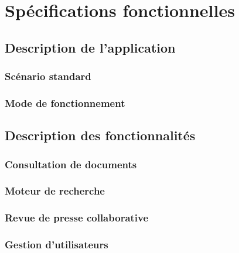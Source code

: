 \section{Spécifications fonctionnelles}
\label{sec:spec}

	\subsection{Description de l'application}
	\label{sec:dapp}

		\subsubsection{Scénario standard}
		\label{sec:scen}

		\subsubsection{Mode de fonctionnement}
		\label{sec:fonc}

	\subsection{Description des fonctionnalités}
	\label{sec:fonc}

		\subsubsection{Consultation de documents}
		\label{sec:cons}

		\subsubsection{Moteur de recherche}
		\label{sec:rech}

		\subsubsection{Revue de presse collaborative}
		\label{sec:revue}

		\subsubsection{Gestion d'utilisateurs}
		\label{sec:utils}

